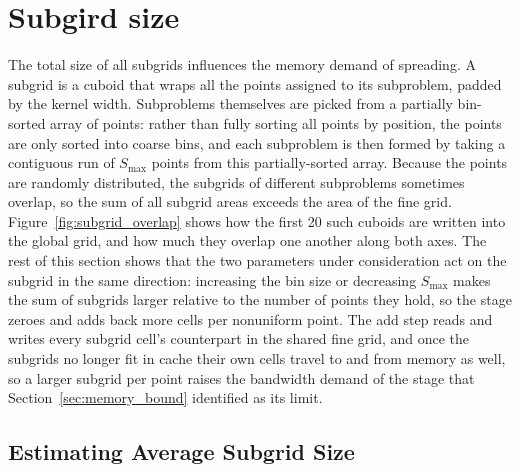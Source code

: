 \section{Subgird size}
\label{sec:subgrid_size}
The total size of all subgrids influences the memory demand of spreading. A subgrid is a cuboid that wraps all the points assigned to its subproblem, padded by the kernel width. Subproblems themselves are picked from a partially bin-sorted array of points: rather than fully sorting all points by position, the points are only sorted into coarse bins, and each subproblem is then formed by taking a contiguous run of $S_{\max}$ points from this partially-sorted array. Because the points are randomly distributed, the subgrids of different subproblems sometimes overlap, so the sum of all subgrid areas exceeds the area of the fine grid. Figure~\ref{fig:subgrid_overlap} shows how the first 20 such cuboids are written into the global grid, and how much they overlap one another along both axes. The rest of this section shows that the two parameters under consideration act on the subgrid in the same direction: increasing the bin size or decreasing $S_{\max}$ makes the sum of subgrids larger relative to the number of points they hold, so the stage zeroes and adds back more cells per nonuniform point. The add step reads and writes every subgrid cell's counterpart in the shared fine grid, and once the subgrids no longer fit in cache their own cells travel to and from memory as well, so a larger subgrid per point raises the bandwidth demand of the stage that Section~\ref{sec:memory_bound} identified as its limit.

\subsection{Estimating Average Subgrid Size}

